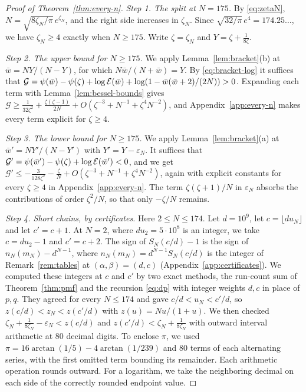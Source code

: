 \begin{proof}[Proof of Theorem~\ref{thm:every-n}]
\emph{Step 1. The split at $N=175$.} By \eqref{eq:zetaN},
$N=\sqrt{8\zeta_N/\pi}\,e^{\zeta_N}$, and the right side increases in
$\zeta_N$. Since $\sqrt{32/\pi}\,e^4=174.25\ldots$, we have $\zeta_N\ge4$
exactly when $N\ge175$. Write $\zeta=\zeta_N$ and $Y=\zeta+\frac1{8\zeta}$.

\emph{Step 2. The upper bound for $N\ge175$.} We apply
Lemma~\ref{lem:bracket}(b) at $\bar w=NY/(N-Y)$, for which $N\bar w/(N+\bar w)=Y$. By
\eqref{eq:bracket-log} it suffices that
$\mathcal G=\psi(\bar w)-\psi(\zeta)+\log \mathcal E(\bar w)+\log(1-\bar w(\bar w+2)/(2N))>0$. Expanding each
term with Lemma~\ref{lem:bessel-bounds} gives
$\mathcal G\ge\frac1{32\zeta^2}+\frac{\zeta(\zeta-1)}{2N}+O(\zeta^{-3}+N^{-1}+\zeta^4N^{-2})$,
and Appendix~\ref{app:every-n} makes every term explicit for $\zeta\ge4$.

\emph{Step 3. The lower bound for $N\ge175$.} We apply
Lemma~\ref{lem:bracket}(a) at $\bar w'=NY'/(N-Y')$ with
$Y'=Y-\varepsilon_N$. It suffices that
$\mathcal G'=\psi(\bar w')-\psi(\zeta)+\log \mathcal E(\bar w')<0$, and we get
$\mathcal G'\le-\frac3{128\zeta^2}-\frac\zeta N+O(\zeta^{-3}+N^{-1}+\zeta^4N^{-2})$,
again with explicit constants for every $\zeta\ge4$ in
Appendix~\ref{app:every-n}. The term $\zeta(\zeta+1)/N$ in $\varepsilon_N$
absorbs the contributions of order $\zeta^2/N$, so that only $-\zeta/N$ remains.

\emph{Step 4. Short chains, by certificates.} Here $2\le N\le174$. Let
$d=10^9$, let $c=\lfloor du_N\rfloor$ and let $c'=c+1$. At $N=2$, where
$du_2=5\cdot10^8$ is an integer, we take $c=du_2-1$ and $c'=c+2$. The sign of $S_N(c/d)-1$ is the sign of $n_N(m_N)-d^{N-1}$, where
$n_N(m_N)=d^{N-1}S_N(c/d)$ is the integer of Remark~\ref{rem:tables} at
$(\alpha,\beta)=(d,c)$ (Appendix~\ref{app:certificates}). We computed these
integers at $c$ and $c'$ by two exact methods, the run-count sum of
Theorem~\ref{thm:pmf} and the recursion \eqref{eq:dp} with integer weights
$d,c$ in place of $p,q$. They agreed for every $N\le174$ and gave
$c/d<u_N<c'/d$, so $z(c/d)<z_N<z(c'/d)$ with $z(u)=Nu/(1+u)$. We then checked
$\zeta_N+\frac1{8\zeta_N}-\varepsilon_N<z(c/d)$ and
$z(c'/d)<\zeta_N+\frac1{8\zeta_N}$ with outward interval arithmetic
at 80 decimal digits. To enclose $\pi$, we used
$\pi=16\arctan(1/5)-4\arctan(1/239)$ and 80 terms of each alternating
series, with the first omitted term bounding its remainder. Each arithmetic
operation rounds outward. For a logarithm, we take the neighboring decimal
on each side of the correctly rounded endpoint value.


\end{proof}
